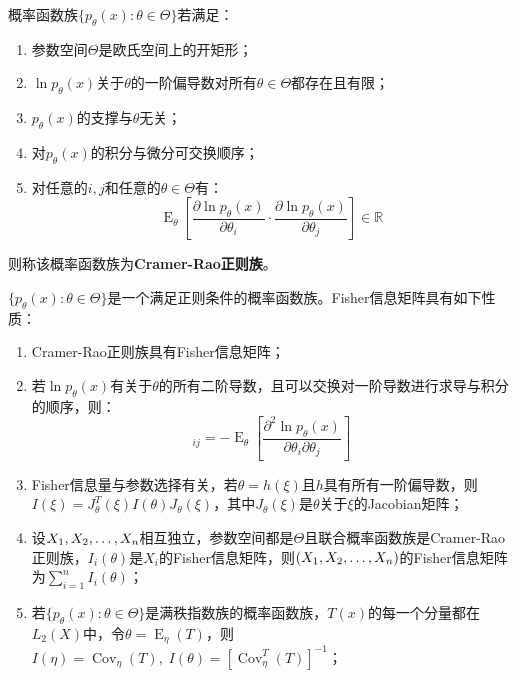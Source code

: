 \begin{definition}
	概率函数族$\{p_{\theta}(x):\theta\in\Theta\}$若满足：
	\begin{enumerate}
		\item 参数空间$\Theta$是欧氏空间上的开矩形；
		\item $\ln p_{\theta}(x)$关于$\theta$的一阶偏导数对所有$\theta\in\Theta$都存在且有限；
		\item $p_{\theta}(x)$的支撑与$\theta$无关；
		\item 对$p_{\theta}(x)$的积分与微分可交换顺序；
		\item 对任意的$i,j$和任意的$\theta\in\Theta$有：
		\begin{equation*}
			\operatorname{E}_{\theta}\left[\frac{\partial\ln p_{\theta}(x)}{\partial\theta_i}\cdot\frac{\partial\ln p_{\theta}(x)}{\partial\theta_j}\right]\in\mathbb{R}^{}
		\end{equation*}
	\end{enumerate}
	则称该概率函数族为\textbf{Cramer-Rao正则族}。
\end{definition}
\begin{property}\label{prop:FIM}
	$\{p_{\theta}(x):\theta\in\Theta\}$是一个满足正则条件的概率函数族。Fisher信息矩阵具有如下性质：
	\begin{enumerate}
		\item Cramer-Rao正则族具有Fisher信息矩阵；
		\item 若$\ln p_{\theta}(x)$有关于$\theta$的所有二阶导数，且可以交换对一阶导数进行求导与积分的顺序，则：
		\begin{equation*}
			[I(\theta)]_{ij}=-\operatorname{E}_{\theta}\left[\frac{\partial^2\ln p_{\theta}(x)}{\partial\theta_i\partial\theta_j}\right]
		\end{equation*}
		\item Fisher信息量与参数选择有关，若$\theta=h(\xi)$且$h$具有所有一阶偏导数，则$I(\xi)=J_{\theta}^T(\xi)I(\theta)J_{\theta}(\xi)$，其中$J_{\theta}(\xi)$是$\theta$关于$\xi$的Jacobian矩阵；
		\item 设$X_1, X_2, \dots, X_{n}$相互独立，参数空间都是$\Theta$且联合概率函数族是Cramer-Rao正则族，$I_i(\theta)$是$X_i$的Fisher信息矩阵，则$(X_1, X_2, \dots, X_{n})$的Fisher信息矩阵为$\sum\limits_{i=1}^{n}I_i(\theta)$；
		\item 若$\{p_{\theta}(x):\theta\in\Theta\}$是满秩指数族的概率函数族，$T(x)$的每一个分量都在$L_2(X)$中，令$\theta=\operatorname{E}_{\eta}(T)$，则$I(\eta)=\operatorname{Cov}_{\eta}(T),\;I(\theta)=[\operatorname{Cov}_{\eta}^T(T)]^{-1}$；
	\end{enumerate}
\end{property}
